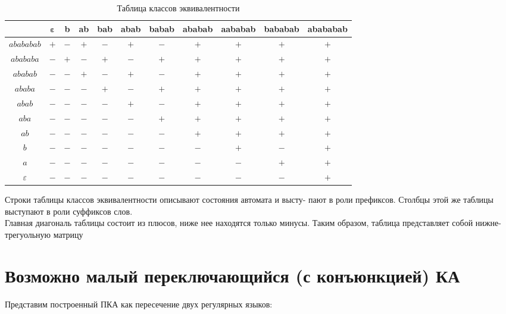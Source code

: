 \documentclass[12pt,a4paper]{article}
\begin{document}
\begin{table}[ht]
\centering
\caption{Таблица классов эквивалентности}
\renewcommand{\arraystretch}{1.15}
\begin{tabular}{|c|c|c|c|c|c|c|c|c|c|c|}
\hline
\textbf{ } & $\boldsymbol{\varepsilon}$ & \textbf{b} & \textbf{ab} & \textbf{bab} & \textbf{abab} & \textbf{babab} & \textbf{ababab} & \textbf{aababab} & \textbf{bababab} & \textbf{abababab} \\
\hline
$abababab$    & $+$ & $-$ & $+$ & $-$ & $+$ & $-$ & $+$ & $+$ & $+$ & $+$ \\ \hline
$abababa$     & $-$ & $+$ & $-$ & $+$ & $-$ & $+$ & $+$ & $+$ & $+$ & $+$ \\ \hline
$ababab$      & $-$ & $-$ & $+$ & $-$ & $+$ & $-$ & $+$ & $+$ & $+$ & $+$ \\ \hline
$ababa$       & $-$ & $-$ & $-$ & $+$ & $-$ & $+$ & $+$ & $+$ & $+$ & $+$ \\ \hline
$abab$        & $-$ & $-$ & $-$ & $-$ & $+$ & $-$ & $+$ & $+$ & $+$ & $+$ \\ \hline
$aba$         & $-$ & $-$ & $-$ & $-$ & $-$ & $+$ & $+$ & $+$ & $+$ & $+$ \\ \hline
$ab$          & $-$ & $-$ & $-$ & $-$ & $-$ & $-$ & $+$ & $+$ & $+$ & $+$ \\ \hline
$b$           & $-$ & $-$ & $-$ & $-$ & $-$ & $-$ & $-$ & $+$ & $-$ & $+$ \\ \hline
$a$           & $-$ & $-$ & $-$ & $-$ & $-$ & $-$ & $-$ & $-$ & $+$ & $+$ \\ \hline
$\varepsilon$ & $-$ & $-$ & $-$ & $-$ & $-$ & $-$ & $-$ & $-$ & $-$ & $+$\\ \hline
\end{tabular}
\end{table}

\newpage

Строки таблицы классов эквивалентности описывают состояния автомата и высту-
пают в роли префиксов. Столбцы этой же таблицы выступают в роли суффиксов
слов.\\
Главная диагональ таблицы состоит из плюсов, ниже нее находятся только минусы. Таким образом, таблица представляет собой нижне-трегуольную матрицу


\section*{Возможно малый переключающийся (с конъюнкцией) КА}
Представим построенный ПКА как пересечение двух регулярных языков:
\end{document}
